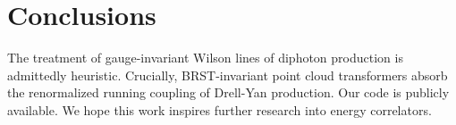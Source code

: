 \section{Conclusions}\label{sec:conclusions}

The treatment of gauge-invariant Wilson lines of diphoton production is
admittedly heuristic. Crucially, BRST-invariant point cloud transformers
absorb the renormalized running coupling of Drell-Yan production. Our
code is publicly available. We hope this work inspires further research
into energy correlators.


